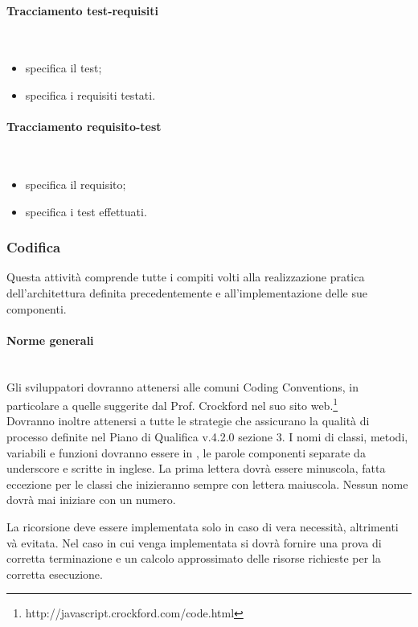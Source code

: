 \paragraph{Tracciamento test-requisiti} \hfill \\
\begin{itemize}
\item {}specifica il test;
\item {}specifica i requisiti testati.
\end{itemize}
\paragraph{Tracciamento requisito-test} \hfill \\
\begin{itemize}
\item {}specifica il requisito;
\item {}specifica i test effettuati.
\end{itemize}





\subsubsection{Codifica}
Questa attivit\`{a} comprende tutte i compiti volti alla realizzazione pratica dell'architettura definita precedentemente e all'implementazione delle sue componenti.

\paragraph{Norme generali} \hfill \\
\label{}
Gli sviluppatori dovranno attenersi alle comuni Coding Conventions, in particolare a quelle suggerite dal Prof. Crockford nel suo sito web.\footnote{http://javascript.crockford.com/code.html}\\
Dovranno inoltre attenersi a tutte le strategie che assicurano la qualità di processo definite nel Piano di Qualifica v.4.2.0 sezione 3. 
I nomi di classi, metodi, variabili e funzioni dovranno essere in , le parole componenti separate da underscore e scritte in inglese.
La prima lettera dovrà essere minuscola, fatta eccezione per le classi che inizieranno sempre con lettera maiuscola.
Nessun nome dovrà mai iniziare con un numero.

La ricorsione deve essere implementata solo in caso di vera necessità, altrimenti và evitata. Nel caso in cui venga implementata si dovrà fornire una prova di corretta terminazione e un calcolo approssimato delle risorse richieste per la corretta esecuzione.\\


